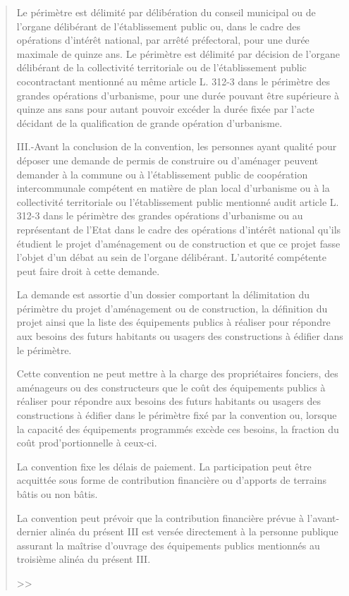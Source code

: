\begin{quote}
{		Le périmètre est délimité par délibération du conseil municipal ou de l'organe délibérant de l'établissement public ou, dans le cadre des opérations d'intérêt national, par arrêté préfectoral, pour une durée maximale de quinze ans. Le périmètre est délimité par décision de l'organe délibérant de la collectivité territoriale ou de l'établissement public cocontractant mentionné au même article L. 312-3 dans le périmètre des grandes opérations d'urbanisme, pour une durée pouvant être supérieure à quinze ans sans pour autant pouvoir excéder la durée fixée par l'acte décidant de la qualification de grande opération d'urbanisme.
		
		III.-Avant la conclusion de la convention, les personnes ayant qualité pour déposer une demande de permis de construire ou d'aménager peuvent demander à la commune ou à l'établissement public de coopération intercommunale compétent en matière de plan local d'urbanisme ou à la collectivité territoriale ou l'établissement public mentionné audit article L. 312-3 dans le périmètre des grandes opérations d'urbanisme ou au représentant de l'Etat dans le cadre des opérations d'intérêt national qu'ils étudient le projet d'aménagement ou de construction et que ce projet fasse l'objet d'un débat au sein de l'organe délibérant. L'autorité compétente peut faire droit à cette demande.
		
		La demande est assortie d'un dossier comportant la délimitation du périmètre du projet d'aménagement ou de construction, la définition du projet ainsi que la liste des équipements publics à réaliser pour répondre aux besoins des futurs habitants ou usagers des constructions à édifier dans le périmètre.
		
		Cette convention ne peut mettre à la charge des propriétaires fonciers, des aménageurs ou des constructeurs que le coût des équipements publics à réaliser pour répondre aux besoins des futurs habitants ou usagers des constructions à édifier dans le périmètre fixé par la convention ou, lorsque la capacité des équipements programmés excède ces besoins, la fraction du coût prod'portionnelle à ceux-ci.
		
		La convention fixe les délais de paiement. La participation peut être acquittée sous forme de contribution financière ou d'apports de terrains bâtis ou non bâtis.
		
		La convention peut prévoir que la contribution financière prévue à l'avant-dernier alinéa du présent III est versée directement à la personne publique assurant la maîtrise d'ouvrage des équipements publics mentionnés au troisième alinéa du présent III.} >>
	\end{quote}
	
